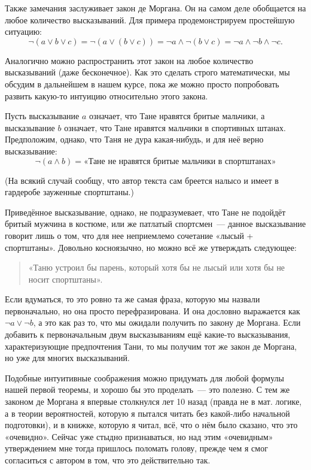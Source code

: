 Также замечания заслуживает закон де Моргана. Он на самом деле обобщается на любое количество высказываний. Для примера продемонстрируем простейшую ситуацию:
$$
\neg(a \lor b \lor c) = \neg(a \lor (b \lor c)) = \neg a \land \neg (b \lor c) = \neg a \land \neg b \land \neg c.
$$

Аналогично можно распространить этот закон на любое количество высказываний (даже бесконечное). Как это сделать строго математически, мы обсудим в дальнейшем в нашем курсе, пока же можно просто попробовать развить какую-то интуицию относительно этого закона.

Пусть высказывание $a$ означает, что Тане нравятся бритые мальчики, а высказывание $b$ означает, что Тане нравятся мальчики в спортивных штанах. Предположим, однако, что Таня не дура какая-нибудь, и для неё верно высказывание:
$$
\neg(a \land b) = \text{«Тане не нравятся бритые мальчики в спортштанах»}
$$

(На всякий случай сообщу, что автор текста сам бреется налысо и имеет в гардеробе зауженные спортштаны.)

Приведённое высказывание, однако, не подразумевает, что Тане не подойдёт бритый мужчина в костюме, или же патлатый спортсмен~— данное высказывание говорит лишь о том, что для нее неприемлемо сочетание «лысый + спортштаны». Довольно косноязычно, но можно всё же утверждать следующее:

\begin{quote}
«Таню устроил бы парень, который хотя бы не лысый или хотя бы не носит спортштаны».
\end{quote}

Если вдуматься, то это ровно та же самая фраза, которую мы назвали первоначально, но она просто перефразирована. И она дословно выражается как $\neg a \lor \neg b$, а это как раз то, что мы ожидали получить по закону де Моргана. Если добавить к первоначальным двум высказываниям ещё какие-то высказывания, характеризующие предпочтения Тани, то мы получим тот же закон де Моргана, но уже для многих высказываний.

Подобные интуитивные соображения можно придумать для любой формулы нашей первой теоремы, и хорошо бы это проде\-лать~— это полезно. С тем же законом де Моргана я впервые столкнулся лет 10 назад (правда не в мат. логике, а в теории вероятностей, которую я пытался читать без какой-либо начальной подготовки), и в книжке, которую я читал, всё, что о нём было сказано, что это «очевидно». Сейчас уже стыдно признаваться, но над этим «очевидным» утверждением мне тогда пришлось поломать голову, прежде чем я смог согласиться с автором в том, что это действительно так.

